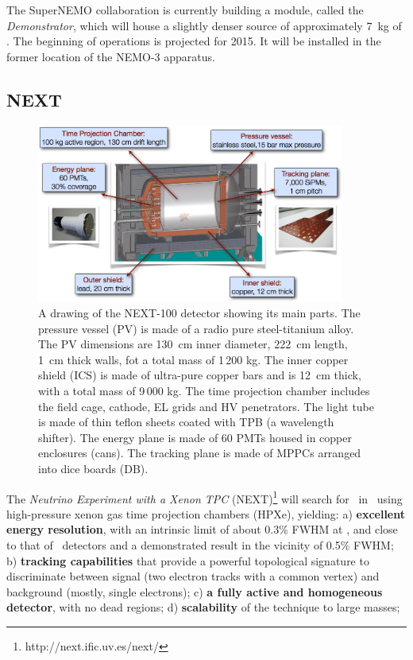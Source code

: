 \documentclass{PoS}
\begin{document}
The SuperNEMO collaboration is currently building a module, 
called the \emph{Demonstrator}, which will house a slightly denser source of approximately 7~kg of \SE. The beginning of operations is projected for 2015. It will be installed in the former location of the NEMO-3 apparatus. 


\subsection{NEXT}
\begin{figure}
\centering
\includegraphics[width=0.9\textwidth]{img/NEXT.png}
\caption{\small A drawing of the NEXT-100 detector showing its main parts. The pressure vessel (PV) is made of a radio pure steel-titanium alloy. The PV dimensions are 130~cm inner diameter, 222~cm length, 1~cm thick walls, fot a total mass of 1\,200 kg. The inner copper shield (ICS) is made of ultra-pure copper bars and is 12~cm thick, with a total mass of 9\,000 kg. The time projection chamber includes the field cage, cathode, EL grids and HV penetrators.
The light tube is made of thin teflon sheets coated with TPB (a wavelength shifter). 
The energy plane is made of 60 PMTs housed in copper enclosures (cans).
The tracking plane is made of MPPCs arranged into dice boards (DB). 
} \label{fig.NEXT100}
\end{figure}

The \emph{Neutrino Experiment with a Xenon TPC} (NEXT)\footnote{http://next.ific.uv.es/next/} will search for \bbonu\ in \XE\ using  high-pressure xenon gas  time projection chambers 
(HPXe)\cite{Nygren:2009zz,Granena:2009it,Alvarez:2012haa}, yielding: 
a) {\bf excellent energy resolution}, with an intrinsic limit of about 0.3\% FWHM at \Qbb, and close to that of \GE\ detectors and a demonstrated result in the vicinity of 0.5\% FWHM; b)
{\bf tracking capabilities} that provide a powerful topological signature to discriminate between signal (two electron tracks with a common vertex) and background (mostly, single electrons); c)
{\bf a fully active and homogeneous detector}, with no dead regions; d) {\bf scalability} of the technique to large masses; 
\end{document}
